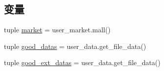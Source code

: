 \subsection*{变量}
\begin{DoxyCompactItemize}
\item 
tuple \hyperlink{namespaceapi_1_1shop_a4ad3ac2221dfb1c48875c21f241d77c2}{market} = user\-\_\-market.\-mall()
\item 
tuple \hyperlink{namespaceapi_1_1shop_a9e7d31f6d45d5d76ef832a93f73e7a08}{good\-\_\-datas} = user\-\_\-data.\-get\-\_\-file\-\_\-data()
\item 
tuple \hyperlink{namespaceapi_1_1shop_a86db8e627498933a3294798776ca3188}{good\-\_\-ext\-\_\-datas} = user\-\_\-data.\-get\-\_\-file\-\_\-data()
\end{DoxyCompactItemize}


